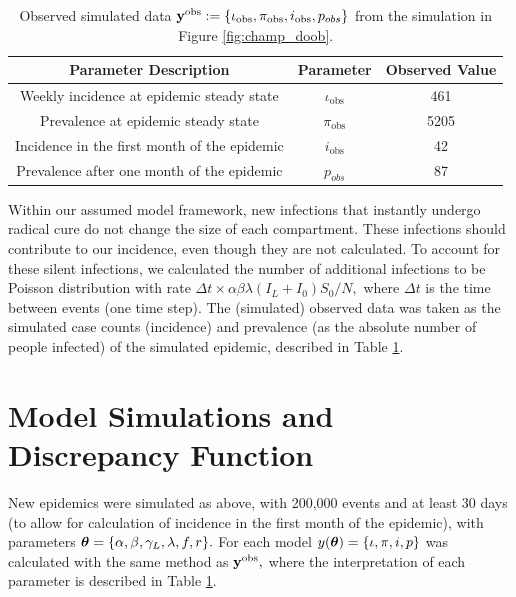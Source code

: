 \begin{table}[htbp]
    \caption[{
        Simulated prevalence and incidence data
    }]{
        Observed simulated data
        $\mathbf{y}^{\mathrm{obs}} := \{\iota_\text{obs}, \pi_\text{obs}, i_\text{obs}, p_{obs}\}$
        from the simulation in Figure \ref{fig:champ_doob}.
    }
    \label{tab:obs_data}
    \centering
    \begin{tabular}{c|c|c}
        Parameter Description                        & Parameter
                                                     & Observed Value     \\
        \hline
        Weekly incidence at epidemic steady state    & $\iota_\text{obs}$
                                                     & 461                \\
        Prevalence at epidemic steady state          & $\pi_\text{obs}$
                                                     & 5205               \\
        Incidence in the first month of the epidemic & $i_\text{obs}$
                                                     & 42                 \\
        Prevalence after one month of the epidemic   & $p_{obs}$
                                                     & 87                 \\
    \end{tabular}
\end{table}


Within our assumed model framework,
new infections that instantly undergo radical cure do not change the size of
each compartment. These infections should contribute to our incidence,
even though they are not calculated. To account for these silent infections,
we calculated the number of additional infections to be
Poisson distribution with rate
$\Delta t \times \alpha \beta \lambda (I_L + I_0) S_0 / N,$ where $\Delta t$ is
the time between events (one time step).
The (simulated) observed data was taken as
the simulated case counts (incidence) and prevalence
(as the absolute number of people infected) of the
simulated epidemic, described in Table \ref{tab:obs_data}.

\section{Model Simulations and Discrepancy Function}

New epidemics were simulated as above, with 200,000 events and at least 30
days (to allow for calculation of incidence in the first month of the
epidemic), with parameters
$\bm{\theta} = \{\alpha, \beta, \gamma_L, \lambda, f, r\}.$
For each model
$y(\bm{\theta}) = \{\iota, \pi, i, p\}$ was
calculated with the same method as $\mathbf{y}^{\mathrm{obs}},$ where the interpretation of each
parameter is described in Table \ref{tab:obs_data}.

